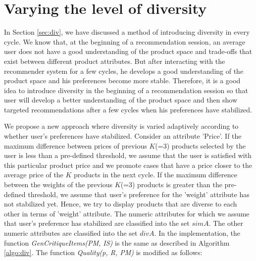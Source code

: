 \section{Varying the level of diversity}
\label{sec:div2}
In Section \ref{sec:div}, we have discussed a method of introducing diversity in every cycle.
We know that, at the beginning of a recommendation session, an average user does not have a good understanding of the product space and trade-offs that exist between different product attributes.
But after interacting with the recommender system for a few cycles, he develops a good understanding of the product space and his preferences become more stable.
Therefore, it is a good idea to introduce diversity in the beginning of a recommendation session so that user will develop a better understanding of the product space and then show targeted recommendations after a few cycles when his preferences have stabilized.

We propose a new approach where diversity is varied adaptively according to whether user's preferences have stabilized.
Consider an attribute 'Price'.
If the maximum difference between prices of previous $K$(=3) products selected by the user is less than a pre-defined threshold, we assume that the user is satisfied with this particular product price and we promote cases that have a price closer to the average price of the $K$ products in the next cycle.
If the maximum difference between the weights of the previous $K$(=3) products is greater than the pre-defined threshold, we assume that user's preference for the 'weight' attribute has not stabilized yet. 
Hence, we try to display products that are diverse to each other in terms of 'weight' attribute.
The numeric attributes for which we assume that user's preference has stabilized are classified into the set $simA$.
The other numeric attributes are classified into the set $divA$.
In the implementation, the function \textit{GenCritiqueItems(PM, IS)} is the same as described in Algorithm \ref{algo:div}.
The function \textit{Quality(p, R, PM)} is modified as follows:

